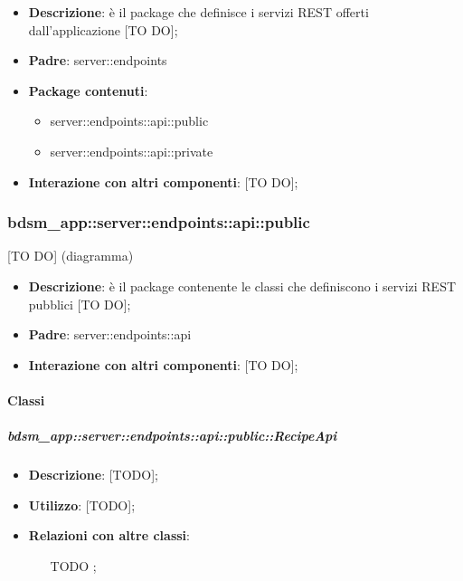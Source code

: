 \begin{itemize}
  \item \textbf{Descrizione}: è il package che definisce i servizi REST offerti dall'applicazione [TO DO];
  \item \textbf{Padre}: server::endpoints
  \item \textbf{Package contenuti}:
  	\begin{itemize}
  		\item server::endpoints::api::public
  		\item server::endpoints::api::private
	\end{itemize}
  \item \textbf{Interazione con altri componenti}: [TO DO];
\end{itemize}

\subsubsection{bdsm\_app::server::endpoints::api::public} %
\label{ssub:bdsm_app_server_endpoints_api_public}
[TO DO] (diagramma) \newline \newline

\begin{itemize}
  \item \textbf{Descrizione}: è il package contenente le classi che definiscono i servizi REST pubblici [TO DO];
  \item \textbf{Padre}: server::endpoints::api
  \item \textbf{Interazione con altri componenti}: [TO DO];
\end{itemize}

	\paragraph{Classi} %

    \subparagraph{bdsm\_app::server::endpoints::api::public::RecipeApi} %
    \label{subp:bdsm_app_server_endpoints_api_public_recipeapi}
    \begin{itemize}
      \item \textbf{Descrizione}: [TODO];
      \item \textbf{Utilizzo}: [TODO];
      \item \textbf{Relazioni con altre classi}:
        \begin{itemize}
          \item [TODO];
        \end{itemize}
      \end{itemize}
    
